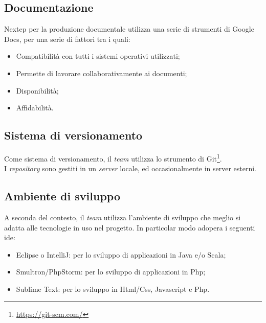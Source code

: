 \subsection{Documentazione}
Nextep per la produzione documentale utilizza una serie di strumenti di Google Docs, per una serie di fattori tra i quali:
\begin{itemize}
\item Compatibilità con tutti i sistemi operativi utilizzati;
\item Permette di lavorare collaborativamente ai documenti;
\item Disponibilità;
\item Affidabilità.
\end{itemize}
\subsection{Sistema di versionamento}
Come sistema di versionamento, il \emph{team} utilizza lo strumento di Git\footnote{\url{https://git-scm.com/}}.\\I \emph{repository} sono gestiti in un \emph{server} locale, ed occasionalmente in server esterni.
\subsection{Ambiente di sviluppo}
A seconda del contesto, il \emph{team} utilizza l'ambiente di sviluppo che meglio si adatta alle tecnologie in uso nel progetto. In particolar modo adopera i seguenti \gls{ide}:
\begin{itemize}
\item Eclipse o IntelliJ: per lo sviluppo di applicazioni in Java e/o Scala;
\item Smultron/PhpStorm: per lo sviluppo di applicazioni in Php;
\item Sublime Text: per lo sviluppo in Html/Css, Javascript e Php.
\end{itemize}
\newpage
